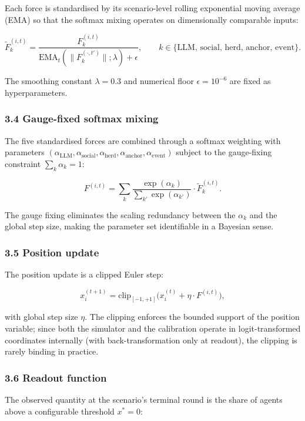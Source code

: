 \documentclass[
]{article}
\begin{document}
Each force is standardised by its scenario-level rolling exponential
moving average (EMA) so that the softmax mixing operates on
dimensionally comparable inputs:

\[
\tilde{F}_k^{(i,t)} = \frac{F_k^{(i,t)}}{\text{EMA}_t(\|F_k^{(\cdot,t')}\|; \lambda) + \epsilon},
\qquad k \in \{\text{LLM, social, herd, anchor, event}\}.
\]

The smoothing constant \(\lambda = 0.3\) and numerical floor
\(\epsilon = 10^{-6}\) are fixed as hyperparameters.

\subsubsection{3.4 Gauge-fixed softmax
mixing}\label{gauge-fixed-softmax-mixing}

The five standardised forces are combined through a softmax weighting
with parameters
\((\alpha_{\text{LLM}}, \alpha_{\text{social}}, \alpha_{\text{herd}}, \alpha_{\text{anchor}}, \alpha_{\text{event}})\)
subject to the gauge-fixing constraint \(\sum_k \alpha_k = 1\):

\[
F^{(i,t)} = \sum_k \frac{\exp(\alpha_k)}{\sum_{k'} \exp(\alpha_{k'})} \cdot \tilde{F}_k^{(i,t)}.
\]

The gauge fixing eliminates the scaling redundancy between the
\(\alpha_k\) and the global step size, making the parameter set
identifiable in a Bayesian sense.

\subsubsection{3.5 Position update}\label{position-update}

The position update is a clipped Euler step:

\[
x_i^{(t+1)} = \text{clip}_{[-1, +1]}\big( x_i^{(t)} + \eta \cdot F^{(i,t)} \big),
\]

with global step size \(\eta\). The clipping enforces the bounded
support of the position variable; since both the simulator and the
calibration operate in logit-transformed coordinates internally (with
back-transformation only at readout), the clipping is rarely binding in
practice.

\subsubsection{3.6 Readout function}\label{readout-function}

The observed quantity at the scenario's terminal round is the share of
agents above a configurable threshold \(x^* = 0\):
\end{document}
